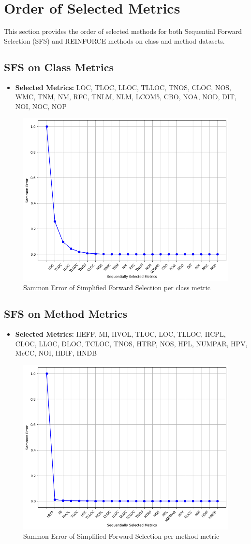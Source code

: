 \section*{Order of Selected Metrics}

This section provides the order of selected methods for both Sequential Forward Selection (SFS) and REINFORCE methods on class and method datasets.

\subsection*{SFS on Class Metrics}
\begin{itemize}
    \item \textbf{Selected Metrics:} LOC, TLOC, LLOC, TLLOC, TNOS, CLOC, NOS, WMC, TNM, NM, RFC, TNLM, NLM, LCOM5, CBO, NOA, NOD, DIT, NOI, NOC, NOP
\end{itemize}

\begin{figure}[H]
    \centering
    \includegraphics[width=0.5\linewidth]{images/class-sfs-named.png}
    \caption{Sammon Error of Simplified Forward Selection per class metric}
    \label{fig:class-sfs-named}
\end{figure}

\subsection*{SFS on Method Metrics}
\begin{itemize}
    \item \textbf{Selected Metrics:} HEFF, MI, HVOL, TLOC, LOC, TLLOC, HCPL, CLOC, LLOC, DLOC, TCLOC, TNOS, HTRP, NOS, HPL, NUMPAR, HPV, McCC, NOI, HDIF, HNDB
\end{itemize}

\begin{figure}[H]
    \centering
    \includegraphics[width=0.5\linewidth]{images/method-sfs-named.png}
    \caption{Sammon Error of Simplified Forward Selection per method metric}
    \label{fig:method-sfs-named}
\end{figure}

